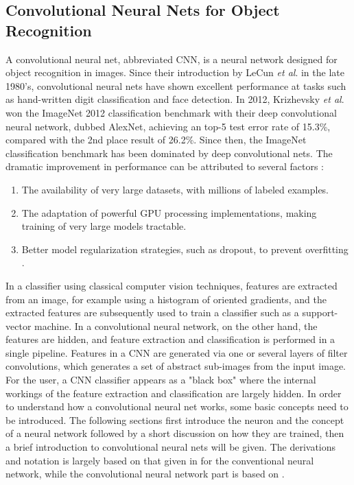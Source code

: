 \subsection{Convolutional Neural Nets for Object Recognition}
A convolutional neural net, abbreviated CNN, is a neural network designed for object recognition in images. Since their introduction by LeCun \textit{et al}. \cite{lecun-89e} in the late 1980's, convolutional neural nets have shown excellent performance at tasks such as hand-written digit classification and face detection. In 2012, Krizhevsky \textit{et al}. \cite{NIPS2012_4824} won the ImageNet 2012 classification benchmark with their deep convolutional neural network, dubbed AlexNet, achieving an top-5 test error rate of 15.3\%, compared with the 2nd place result of 26.2\%. Since then, the ImageNet classification benchmark has been dominated by deep convolutional nets. The dramatic improvement in performance can be attributed to several factors \cite{DBLP:journals/corr/ZeilerF13}:
\begin{enumerate}
	\item The availability of very large datasets, with millions of labeled examples.
	\item The adaptation of powerful GPU processing implementations, making training of very large models tractable.
	\item Better model regularization strategies, such as dropout, to prevent overfitting \cite{dropout}.
\end{enumerate}
In a classifier using classical computer vision techniques, features are extracted from an image, for example using a histogram of oriented gradients, and the extracted features are subsequently used to train a classifier such as a support-vector machine. In a convolutional neural network, on the other hand, the features are hidden, and feature extraction and classification is performed in a single pipeline. Features in a CNN are generated via one or several layers of filter convolutions, which generates a set of abstract sub-images from the input image. For the user, a CNN classifier appears as a "black box" where the internal workings of the feature extraction and classification are largely hidden. In order to understand how a convolutional neural net works, some basic concepts need to be introduced. The following sections first introduce the neuron and the concept of a neural network followed by a short discussion on how they are trained, then a brief introduction to convolutional neural nets will be given. The derivations and notation is largely based on that given in \cite{machine_learning} for the conventional neural network, while the convolutional neural network part is based on \cite{Goodfellow-et-al-2016}.
